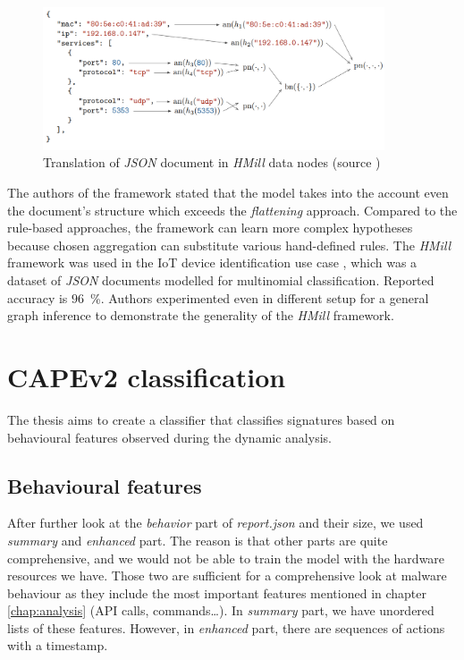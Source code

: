 
\begin{figure}[h]
    \centering
    \includegraphics[width=0.9\textwidth]{figures/translation.png}
    \caption{Translation of \emph{JSON} document in \emph{HMill} data nodes (source \cite{Mandlik2020})}
    \label{fig:jsonhmill}
\end{figure}

The authors of the framework stated that the model takes into the account even the document's structure which exceeds the \emph{flattening} approach. Compared to the rule-based approaches, the framework can learn more complex hypotheses because chosen aggregation can substitute various hand-defined rules. The \emph{HMill} framework was used in the IoT device identification use case \cite{Mandlik2020}, which was a dataset of \emph{JSON} documents modelled for multinomial classification. Reported accuracy is $96$~\%. Authors experimented even in different setup for a general graph inference to demonstrate the generality of the \emph{HMill} framework.


\section{CAPEv2 classification}
The thesis aims to create a classifier that classifies signatures based on behavioural features observed during the dynamic analysis.

\subsection{Behavioural features}
After further look at the \emph{behavior} part of \emph{report.json} and their size, we used \emph{summary} and \emph{enhanced} part. The reason is that other parts are quite comprehensive, and we would not be able to train the model with the hardware resources we have. Those two are sufficient for a comprehensive look at malware behaviour as they include the most important features mentioned in chapter \ref{chap:analysis} (API calls, commands\dots). In \emph{summary} part, we have unordered lists of these features. However, in \emph{enhanced} part, there are sequences of actions with a timestamp.

